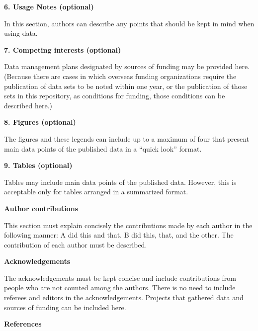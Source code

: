 \documentclass[english]{article}
\begin{document}
\begin{center}
{\bf 6. Usage Notes (optional)}
\end{center}

In this section, authors can describe any points that should be kept in mind when using data.

\begin{center}
{\bf 7. Competing interests (optional)}
\end{center}

 Data management plans designated by sources of funding may be provided here.(Because there are cases in which overseas funding organizations require the publication of data sets to be noted within one year, or the publication of those sets in this repository, as conditions for funding, those conditions can be described here.)

\begin{center}
{\bf 8. Figures (optional)}
\end{center}

 The figures and these legends can include up to a maximum of four that present main data points of the published data in a “quick look” format.

\begin{center}
{\bf 9. Tables (optional)}
\end{center}

 Tables may include main data points of the published data. However, this is acceptable only for tables arranged in a summarized format.

\begin{center}
{\bf Author contributions}
\end{center}

 This section must explain concisely the contributions made by each author in the following manner:
A did this and that.
B did this, that, and the other. 
The contribution of each author must be described.

\begin{center}
{\bf Acknowledgements}
\end{center}

 The acknowledgements must be kept concise and include contributions from people who are not counted among the authors. There is no need to include referees and editors in the acknowledgements.  Projects that gathered data and sources of funding can be included here.

\begin{center}
{\bf References}
\end{center}
\end{document}
